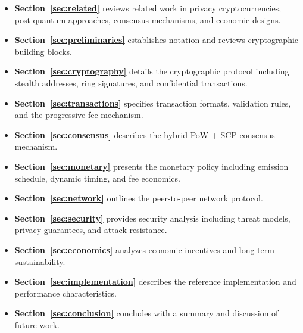 \begin{itemize}
  \item \textbf{Section~\ref{sec:related}} reviews related work in privacy
    cryptocurrencies, post-quantum approaches, consensus mechanisms, and
    economic designs.

  \item \textbf{Section~\ref{sec:preliminaries}} establishes notation and
    reviews cryptographic building blocks.

  \item \textbf{Section~\ref{sec:cryptography}} details the cryptographic
    protocol including stealth addresses, ring signatures, and confidential
    transactions.

  \item \textbf{Section~\ref{sec:transactions}} specifies transaction
    formats, validation rules, and the progressive fee mechanism.

  \item \textbf{Section~\ref{sec:consensus}} describes the hybrid PoW + SCP
    consensus mechanism.

  \item \textbf{Section~\ref{sec:monetary}} presents the monetary policy
    including emission schedule, dynamic timing, and fee economics.

  \item \textbf{Section~\ref{sec:network}} outlines the peer-to-peer
    network protocol.

  \item \textbf{Section~\ref{sec:security}} provides security analysis
    including threat models, privacy guarantees, and attack resistance.

  \item \textbf{Section~\ref{sec:economics}} analyzes economic incentives
    and long-term sustainability.

  \item \textbf{Section~\ref{sec:implementation}} describes the reference
    implementation and performance characteristics.

  \item \textbf{Section~\ref{sec:conclusion}} concludes with a summary and
    discussion of future work.
\end{itemize}
